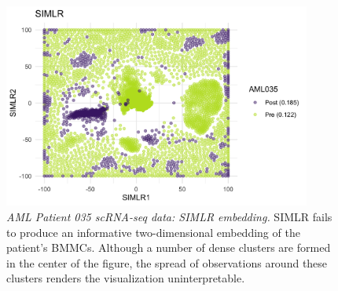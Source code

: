 \documentclass{article}
\begin{document}
\begin{figure}[!htbp]
    \centering
    \includegraphics[width=0.9\textwidth]{figures/aml035_SIMLR.png}
    \caption{
    {\em AML Patient 035 scRNA-seq data: SIMLR embedding.} SIMLR fails to produce an informative two-dimensional embedding of the patient's BMMCs. Although a number of dense clusters are formed in the center of the figure, the spread of observations around these clusters renders the visualization uninterpretable.}
    \label{fig:SIMLR_aml_035}
\end{figure}
\end{document}

